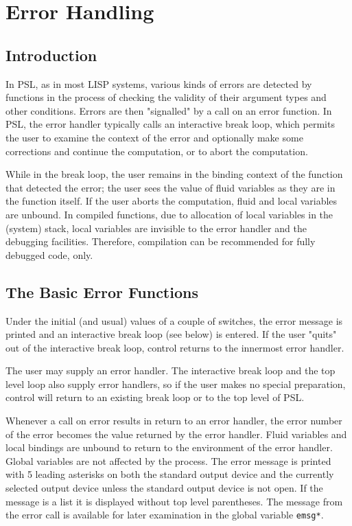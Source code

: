 \chapter{Error Handling}

\section{Introduction}

  In  PSL,  as in most LISP systems, various kinds of errors are
detected by functions in the process of checking the validity of
their argument types and other  conditions.    Errors  are  then
"signalled"  by  a call on an error function.  In PSL, the error
handler typically calls an interactive break loop, which permits
the user to examine the context of the error and optionally make
some corrections and continue the computation, or to  abort  the
computation.

  While  in  the  break  loop,  the  user remains in the binding
context of the function that detected the error; the  user  sees
the value of fluid variables as they are in the function itself.
If  the  user  aborts the computation, fluid and local variables
are unbound. In compiled functions, due to allocation of local variables
in the (system) stack, local variables are invisible to the error
handler and the debugging facilities. Therefore, compilation can
be recommended for fully debugged code, only.

\section{The Basic Error Functions}

{    Under  the  initial  (and  usual)  values  of  a  couple  of
    switches,  the  error  message is printed and an interactive
    break loop (see below) is entered.  If the user "quits"  out
    of  the  interactive  break  loop,  control  returns  to the
    innermost error handler.  }

    The user may supply an error handler. The interactive break
    loop and the top level loop also supply error handlers, so
    if the user makes no special preparation, control will
    return to an existing break loop or to the top level of PSL.


    Whenever a call on error  results  in  return  to  an  error
    handler,  the  error  number  of the error becomes the value
    returned by the error handler.  Fluid  variables  and  local
    bindings  are  unbound  to  return to the environment of the
    error handler.  Global variables are  not  affected  by  the
    process.    The  error  message  is  printed  with 5 leading
    asterisks  on  both  the  standard  output  device  and  the
    currently  selected output device unless the standard output
    device is not open.    If  the  message  is  a  list  it  is
    displayed  without  top level parentheses.  The message from
    the error call is available for  later  examination  in  the
    global variable {\tt emsg*}.

